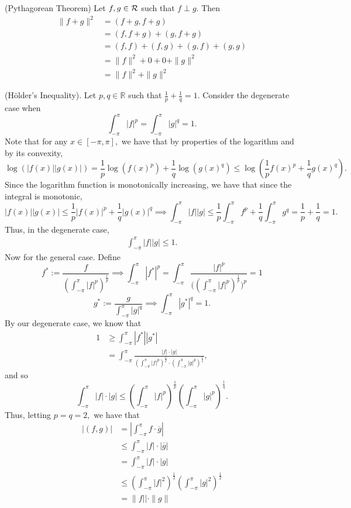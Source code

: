 \documentclass[11pt]{article}
\newcommand{\bbR}{\mathbb{R}}
\begin{document}
\begin{solution}
    (Pythagorean Theorem) Let $f,g \in \cal R$ such that $f \perp g.$  Then 
    \begin{align*}
        \|f + g\|^2 &= (f + g, f + g)\\
        &= (f,f + g) + (g, f + g)\\
        &= (f,f) + (f,g) + (g,f) + (g,g)\\
        &= \|f\|^2 + 0 + 0 + \|g\|^2\\
        &= \|f\|^2 + \|g\|^2
    \end{align*}


    (H\"older's Inequality). Let $p,q \in \bbR$ such that $\frac{1}{p} + \frac{1}{q} = 1.$ Consider the degenerate case when 
    \[\int_{-\pi}^\pi |f|^p = \int_{-\pi}^\pi |g|^q = 1.\] Note that for any $x\in [-\pi, \pi],$ we have that by properties of the logarithm and by its convexity,
    \[\log(|f(x)| |g(x)|) = \frac{1}{p}\log(f(x)^p) + \frac{1}{q}\log(g(x)^q) \leq \log\left(\frac{1}{p}f(x)^p + \frac{1}{q}g(x)^q\right).\] Since the logarithm function is monotonically increasing, we have that since the integral is monotonic,
    \[|f(x)||g(x)| \leq \frac{1}{p}|f(x)|^p + \frac{1}{q}|g(x)|^q \implies \int_{-\pi}^\pi |f||g| \leq \frac{1}{p}\int_{-\pi}^\pi f^p + \frac{1}{q}\int_{-\pi}^\pi g^q = \frac{1}{p} + \frac{1}{q} = 1.\] Thus, in the degenerate case,
    \begin{align}
        \int_{-\pi}^\pi |f||g| \leq 1. 
    \end{align}
    Now for the general case. Define 
    \[f^*:= \frac{f}{\left(\int_{-\pi}^\pi |f|^p\right)^{\frac{1}{p}}} \implies \int_{-\pi}^\pi |f^*|^p = \int_{-\pi}^\pi \frac{|f|^p}{\bigg(\left(\int_{-\pi}^\pi |f|^p\right)^\frac{1}{p}\bigg)^p} = 1\]
    \[g^*:=\frac{g}{\int_{-\pi}^\pi |g|^q} \implies \int_{-\pi}^\pi |g^*|^q = 1.\] By our degenerate case, we know that 
    \begin{align*}
        1 &\geq \int_{-\pi}^\pi |f^*||g^*|\\
        &= \int_{-\pi}^\pi \frac{|f|\cdot |g|}{\left(\int_{-\pi}^\pi |f|^p\right)^\frac{1}{p} \cdot \left(\int_{-\pi}^\pi |g|^p\right)^\frac{1}{q}},
    \end{align*}
and so 
\[\int_{-\pi}^\pi|f|\cdot|g| \leq \left(\int_{-\pi}^\pi |f|^p\right)^\frac{1}{p}\left(\int_{-\pi}^\pi |g|^p\right)^\frac{1}{q}.\] Thus, letting $p = q = 2,$ we have that 
\begin{align*}
    |(f,g)| &= \left|\int_{-\pi}^\pi f \cdot \overline{g}\right| \\
    &\leq \int_{-\pi}^\pi |f|\cdot |\overline{g}|\\
    &=\int_{-\pi}^\pi |f|\cdot |g|\\
    &\leq \left(\int_{-\pi}^\pi |f|^2\right)^\frac{1}{2}\left(\int_{-\pi}^\pi |g|^2\right)^\frac{1}{2}\\
    &= \|f|| \cdot \|g\|
\end{align*}


\end{solution}
\end{document}
